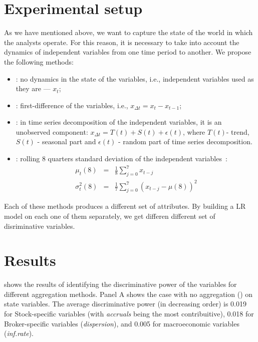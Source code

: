 \section{Experimental setup}
\label{ch3-sec:exp_setup}

As we have mentioned above, we want to capture the state of the world in which the analysts operate. For this reason, it is necessary to take into account the dynamics of independent variables from one time period to another. We propose the following methods:
\begin{itemize}
\item \raw{}: no dynamics in the state of the  variables, i.e., independent variables used as they are --- $x_t$;
\item  \diff{}: first-difference  of the variables, i.e., $x_{\Delta{t}}=x_t-x_{t-1}$;
\item  \random{}: in time series decomposition of the independent variables, it is an unobserved component: $x_{\Delta{t}}=T(t)+S(t)+\epsilon (t)$, where $T(t)$- trend, $S(t)$ - seasonal part and $\epsilon (t)$ - random part of time series decomposition.
\item  \rollsd{}: rolling 8 quarters standard deviation of the independent variables~\citep{zivot2003}:
\begin{eqnarray}
\mu_t(8)&=&\frac{1}{8}\sum_{j=0}^7 x_{t-j} \nonumber \\
\sigma^2_t(8)&=&\frac{1}{7}\sum_{j=0}^7 (x_{t-j}-\mu(8))^2
\end{eqnarray}

\end{itemize}
Each of these methods produces a different set of attributes. By building a LR model on each one of them separately, we get differen different set of disriminative variables.


\section{Results}
\label{ch3-sec:results}


 shows the results of identifying the discriminative power of the variables for different aggregation methods. Panel A shows the case with no aggregation (\raw{}) on state variables. The average discriminative power (in decreasing order) is 0.019 for Stock-specific variables (with \textit{accruals} being the most contribuitive), 0.018 for Broker-specific variables (\textit{dispersion}), and 0.005 for macroeconomic variables (\textit{inf.rate}).

